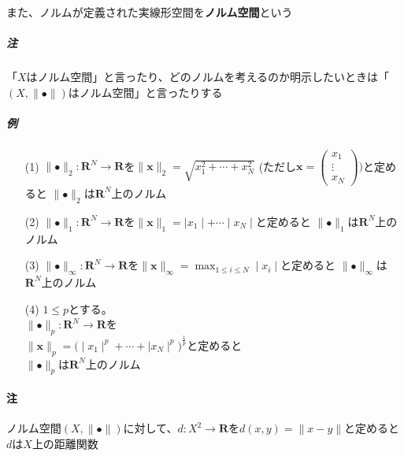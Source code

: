 \documentclass[12pt,a4paper]{article}
\begin{document}
        また、ノルムが定義された実線形空間を{\bf ノルム空間}という
        \subparagraph{注} 
      「$X$はノルム空間」と言ったり、どのノルムを考えるのか明示したいときは「$(X, \parallel \bullet \parallel)$はノルム空間」と言ったりする

        \subparagraph{例}
          \begin{itemize}
            \item[(1)] $\parallel \bullet \parallel_2 : \mathbf{R}^N \rightarrow \mathbf{R}$を$\parallel \mathbf{x} \parallel_2 = \sqrt{x_1^2 + \cdots + x_N^2}$
              (ただし$\mathbf{x} = \begin{pmatrix} x_1 \\ \vdots \\ x_N \end{pmatrix})$と定めると
              $\parallel \bullet \parallel_2$は$\mathbf{R}^N$上のノルム
            \item[(2)] $\parallel \bullet \parallel_1 : \mathbf{R}^N \rightarrow \mathbf{R}$を$\parallel \mathbf{x} \parallel_1 = \mid x_1 \mid + \cdots  \mid x_N \mid$と定めると
              $\parallel \bullet \parallel_1$は$\mathbf{R}^N$上のノルム
            \item[(3)] $\parallel \bullet \parallel_\infty : \mathbf{R}^N \rightarrow \mathbf{R}$を$\parallel \mathbf{x} \parallel_\infty = \max_{1 \leq i \leq N} \mid x_i \mid $と定めると
              $\parallel \bullet \parallel_\infty$は$\mathbf{R}^N$上のノルム
            \item[(4)] $1 \leq p$とする。\\ $\parallel\bullet\parallel_p : \mathbf{R}^N \rightarrow \mathbf{R}$を \\
            $\parallel \mathbf{x} \parallel_p = {\big( \mid x_1\mid^p + \cdots + \mid x_N \mid^p \big)}^\frac1p$と定めると \\
              $\parallel\bullet\parallel_p$は$\mathbf{R}^N$上のノルム
          \end{itemize}

        \paragraph{注}
          ノルム空間$(X, \parallel\bullet\parallel)$に対して、$d: X^2 \rightarrow \mathbf{R}$を$d(x, y) = \parallel x - y \parallel$と定めると$d$は$X$上の距離関数
\end{document}
